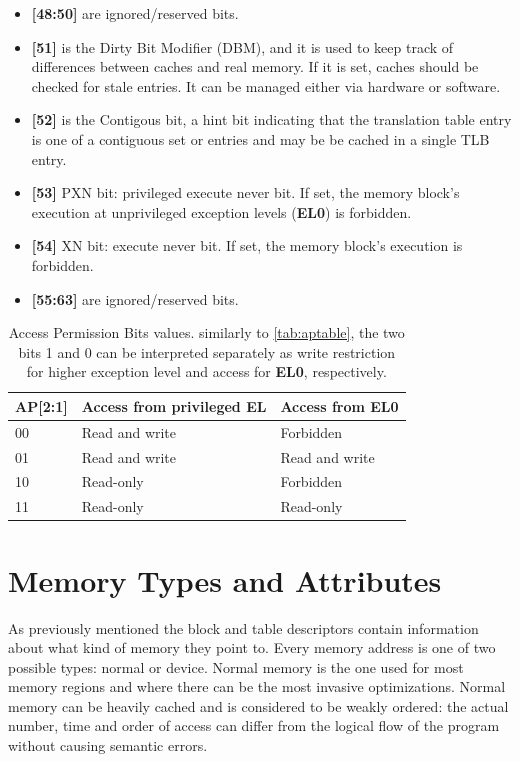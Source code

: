 \documentclass[12pt,a4paper,openright,twoside]{report}
\begin{document}
\begin{itemize}
    \item \textbf{[48:50]} are ignored/reserved bits.
    \item \textbf{[51]} is the Dirty Bit Modifier (DBM), and it is used to keep
        track of differences between caches and real memory. If it is set, caches
        should be checked for stale entries. It can be managed either via 
        hardware or software.
    \item \textbf{[52]} is the Contigous bit, a hint bit indicating that the 
        translation table entry is one of a contiguous set or entries and may be
        be cached in a single TLB entry.
    \item \textbf{[53]} PXN bit: privileged execute never bit. If set, the memory block's 
        execution at unprivileged exception levels (\textbf{EL0}) is forbidden.
    \item \textbf{[54]} XN bit: execute never bit. If set, the memory block's 
        execution is forbidden.
    \item \textbf{[55:63]} are ignored/reserved bits.
\end{itemize}

\begin{table}[]
    \begin{center}
    \begin{tabular}{|l|l|l|}
    \hline
    \rowcolor[HTML]{9B9B9B} 
    AP{[}2:1{]} & Access from privileged EL & Access from EL0 \\ \hline
    00          & Read and write            & Forbidden       \\ \hline
    01          & Read and write            & Read and write  \\ \hline
    10          & Read-only                 & Forbidden       \\ \hline
    11          & Read-only                 & Read-only       \\ \hline
    \end{tabular}
    \caption[APBits]{Access Permission Bits values. similarly to \ref{tab:aptable},
    the two bits 1 and 0 can be interpreted separately as write restriction for higher
    exception level and access for \textbf{EL0}, respectively.}
    \label{tab:apbits}
\end{center}
    \end{table}



\section{Memory Types and Attributes}
\label{mair}
As previously mentioned the block and table descriptors contain information about
what kind of memory they point to.
Every memory address is one of two possible types: normal or device.
Normal memory is the one used for most memory regions and where there can be 
the most invasive optimizations. Normal memory can be heavily cached and is 
considered to be weakly ordered: the actual number, time and order of access can 
differ from the logical flow of the program without causing semantic errors.
\end{document}
